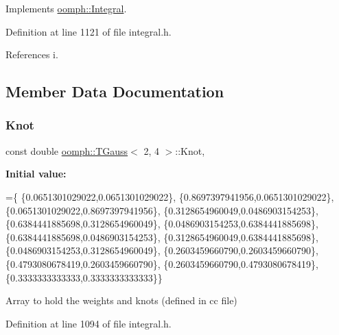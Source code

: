 Implements \hyperlink{classoomph_1_1Integral_ac65335e2aab120b285b3d6c294507b06}{oomph\+::\+Integral}.



Definition at line 1121 of file integral.\+h.



References i.



\subsection{Member Data Documentation}
\mbox{\label{classoomph_1_1TGauss_3_012_00_014_01_4_a40487ef4ddee551e38fdce16dcd537ea}} 
\subsubsection{\texorpdfstring{Knot}{Knot}}
{\footnotesize\ttfamily const double \hyperlink{classoomph_1_1TGauss}{oomph\+::\+T\+Gauss}$<$ 2, 4 $>$\+::Knot\hspace{0.3cm}{\ttfamily [static]}, {\ttfamily [private]}}

{\bfseries Initial value\+:}
\begin{DoxyCode}
=\{
 \{0.0651301029022,0.0651301029022\},
 \{0.8697397941956,0.0651301029022\},
 \{0.0651301029022,0.8697397941956\},
 \{0.3128654960049,0.0486903154253\},
 \{0.6384441885698,0.3128654960049\},
 \{0.0486903154253,0.6384441885698\},
 \{0.6384441885698,0.0486903154253\},
 \{0.3128654960049,0.6384441885698\},
 \{0.0486903154253,0.3128654960049\},
 \{0.2603459660790,0.2603459660790\},
 \{0.4793080678419,0.2603459660790\},
 \{0.2603459660790,0.4793080678419\},
 \{0.3333333333333,0.3333333333333\}\}
\end{DoxyCode}


Array to hold the weights and knots (defined in cc file) 



Definition at line 1094 of file integral.\+h.

\mbox{\label{classoomph_1_1TGauss_3_012_00_014_01_4_aab349ebbfc0ea19da48b832686a2f5c8}} 
